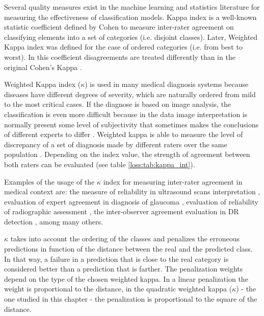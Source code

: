 Several quality measures exist in the machine learning and statistics literature \citep{mehdiyev2016evaluating} for measuring the effectiveness of classification models. 
Kappa index is a well-known statistic coefficient defined by Cohen \citep{cohen1960coefficient} to measure inter-rater agreement on classifying elements into a set of categories (i.e. disjoint classes).
Later, Weighted Kappa index was defined for the case of ordered categories (i.e. from best to worst). In this coefficient disagreements are treated differently than in the original Cohen's Kappa \citep{cohen1968weighted}. 

Weighted Kappa index ($\kappa$) is used in many medical diagnosis systems because diseases have different degrees of severity, which are naturally ordered from mild to the most critical cases. If the diagnose is based on image analysis, the classification is even more difficult because in the data image interpretation is normally present some level of subjectivity that sometimes makes the conclusions of different experts to differ \citep{hripcsak2002measuring}.
Weighted kappa is able to measure the level of discrepancy of a set of diagnosis made by different raters over the same population \citep{viera2005understanding}. Depending on the index value, the strength of agreement between both raters can be evaluated (see table \ref{loss:tab:kappa_int}). 

Examples of the usage of the $\kappa$ index for measuring inter-rater agreement in medical context are: the measure of reliability in ultrasound scans interpretation \citep{hintz2007interobserver}, evaluation of expert agreement in diagnosis of glaucoma \citep{varma1992expert}, evaluation of reliability of radiographic assessment \citep{gunther1999reliability}, the inter-observer agreement evaluation in DR detection \citep{patra2009interobserver}, among many others. 

$\kappa$ takes into account the ordering of the classes and penalizes the erroneous predictions in function of the distance between the real and the predicted class. In that way, a failure in a prediction that is close to the real category is considered better than a prediction that is farther. The penalization weights depend on the type of the chosen weighted kappa. In a linear penalization the weight is proportional to the distance, in the quadratic weighted kappa ($\kappa$) - the one studied in this chapter - the penalization is proportional to the square of the distance. %

